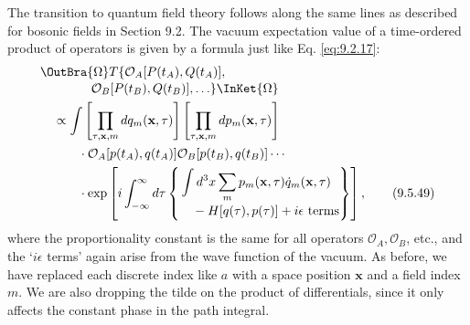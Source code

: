 The transition to quantum field theory follows along the same lines as
described for bosonic fields in Section 9.2. The vacuum expectation value of a
time-ordered product of operators is given by a formula just like Eq. \eqref{eq:9.2.17}:
\begin{align}
&\OutBra{\Omega}T\{\mathcal{O}_A[P(t_A),Q(t_A)],
\notag\\[-2pt]
&\qquad\qquad\mathcal{O}_B[P(t_B),Q(t_B)],\ldots\}
 \InKet{\Omega}
\notag\\
&\quad\propto\int
 \left[\prod_{\tau,\mathbf{x},m}dq_m(\mathbf{x},\tau)\right]
 \left[\prod_{\tau,\mathbf{x},m}dp_m(\mathbf{x},\tau)\right]
\notag\\
&\qquad\quad\cdot\mathcal{O}_A[p(t_A),q(t_A)]
 \mathcal{O}_B[p(t_B),q(t_B)]\cdots
\notag\\
&\qquad\quad\cdot\exp\left[i\int_{-\infty}^{\infty}d\tau
 \left\{\begin{aligned}
 &\int d^3x\sum_mp_m(\mathbf{x},\tau)\dot q_m(\mathbf{x},\tau)\\[-2pt]
 &\quad{}-H[q(\tau),p(\tau)]+i\epsilon\text{ terms}
 \end{aligned}\right\}\right],
\tag{9.5.49}\label{eq:9.5.49}
\end{align}
where the proportionality constant is the same for all operators
$\mathcal{O}_A,\mathcal{O}_B$, etc., and the `$i\epsilon$ terms' again arise
from the wave function of the vacuum. As before, we have replaced each
discrete index like $a$ with a space position $\mathbf{x}$ and a field index
$m$. We are also dropping the tilde on the product of differentials, since it
only affects the constant phase in the path integral.

